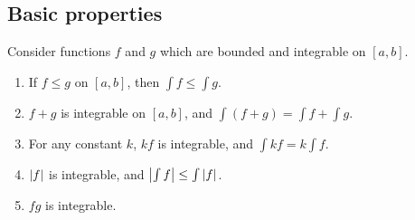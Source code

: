 \subsection{Basic properties}
Consider functions \(f\) and \(g\) which are bounded and integrable on \([a, b]\).
\begin{enumerate}[(1)]
	\item If \(f \leq g\) on \([a, b]\), then \(\int f \leq \int g\).
	\item \(f + g\) is integrable on \([a, b]\), and \(\int (f + g) = \int f + \int g\).
	\item For any constant \(k\), \(kf\) is integrable, and \(\int kf = k\int f\).
	\item \(\abs{f}\) is integrable, and \(\abs{\int f} \leq \int \abs{f}\).
	\item \(fg\) is integrable.
\end{enumerate}

